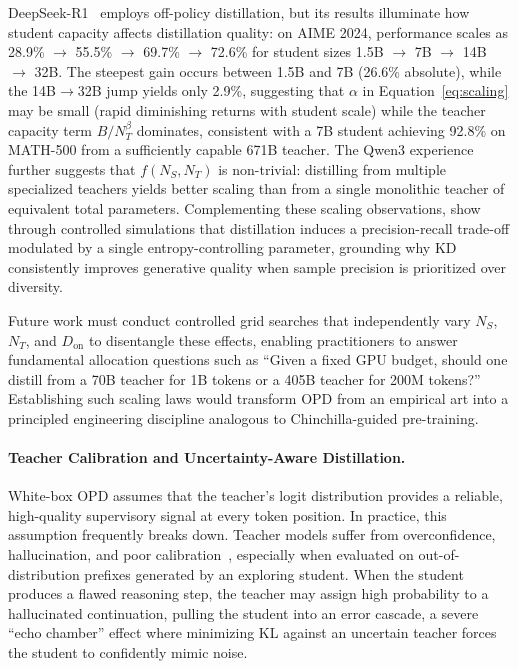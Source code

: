 \documentclass{article} %
\begin{document}
DeepSeek-R1~\citep{2501.12948} employs off-policy distillation, but its results illuminate how student capacity affects distillation quality: on AIME 2024, performance scales as 28.9\% $\to$ 55.5\% $\to$ 69.7\% $\to$ 72.6\% for student sizes 1.5B $\to$ 7B $\to$ 14B $\to$ 32B. The steepest gain occurs between 1.5B and 7B (26.6\% absolute), while the 14B$\to$32B jump yields only 2.9\%, suggesting that $\alpha$ in Equation~\ref{eq:scaling} may be small (rapid diminishing returns with student scale) while the teacher capacity term $B/N_T^\beta$ dominates, consistent with a 7B student achieving 92.8\% on MATH-500 from a sufficiently capable 671B teacher. The Qwen3 experience~\citep{2505.09388} further suggests that $f(N_S, N_T)$ is non-trivial: distilling from multiple specialized teachers yields better scaling than from a single monolithic teacher of equivalent total parameters. Complementing these scaling observations, \citet{2505.13111} show through controlled simulations that distillation induces a precision-recall trade-off modulated by a single entropy-controlling parameter, grounding why KD consistently improves generative quality when sample precision is prioritized over diversity.

Future work must conduct controlled grid searches that independently vary $N_S$, $N_T$, and $D_{\text{on}}$ to disentangle these effects, enabling practitioners to answer fundamental allocation questions such as ``Given a fixed GPU budget, should one distill from a 70B teacher for 1B tokens or a 405B teacher for 200M tokens?'' Establishing such scaling laws would transform OPD from an empirical art into a principled engineering discipline analogous to Chinchilla-guided pre-training.

\paragraph{Teacher Calibration and Uncertainty-Aware Distillation.}
White-box OPD assumes that the teacher's logit distribution provides a reliable, high-quality supervisory signal at every token position. In practice, this assumption frequently breaks down. Teacher models suffer from overconfidence, hallucination, and poor calibration~\citep{2603.07079}, especially when evaluated on out-of-distribution prefixes generated by an exploring student. When the student produces a flawed reasoning step, the teacher may assign high probability to a hallucinated continuation, pulling the student into an error cascade, a severe ``echo chamber'' effect where minimizing KL against an uncertain teacher forces the student to confidently mimic noise.
\end{document}
